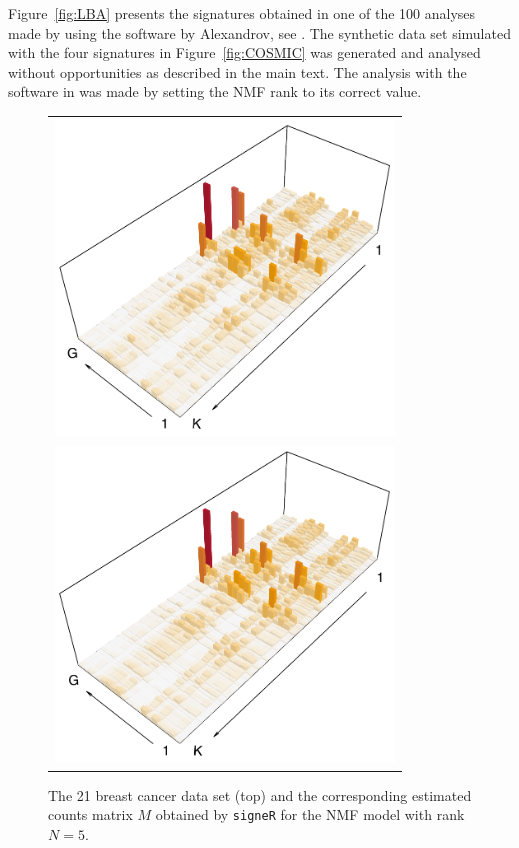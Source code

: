\documentclass[11pt]{amsart}
\theoremstyle{definition}
\begin{document}
Figure~\ref{fig:LBA} presents the signatures obtained in one of the
100 analyses made by using the software by Alexandrov, see
\cite{A}. The synthetic data set simulated with the four signatures in
Figure~\ref{fig:COSMIC} was generated and analysed without
opportunities as described in the main text. The analysis with the
software in \cite{A} was made by setting the NMF rank to its correct
value.


\begin{center}
\begin{figure}
 \begin{tabular}{c}
 \includegraphics[width=9cm]{sfigs/21_Breast_Cancer_3D_M} 
 \\
 \includegraphics[width=9cm]{sfigs/21_Breast_Cancer_3D_Mhat} 
 \end{tabular}
 \caption{The 21 breast cancer data set (top) and the corresponding 
   estimated counts matrix $M$ obtained by \texttt{signeR} for the NMF
   model with rank $N=5$.
 }\label{fig:bcancerDATA}
\end{figure}
\end{center}
\end{document}
